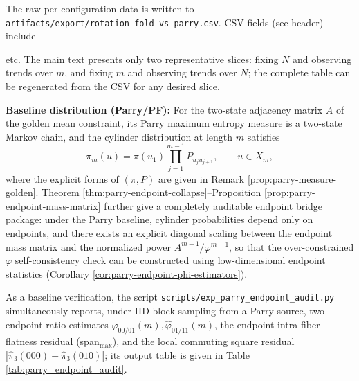 \begin{remark}\label{rem:exp-data-files}
\begin{sloppypar}
The raw per-configuration data is written to \texttt{artifacts/export/rotation\_fold\_vs\_parry.csv}. CSV fields (see header) include
\begin{center}
\end{center}
etc. The main text presents only two representative slices: fixing $N$ and observing trends over $m$, and fixing $m$ and observing trends over $N$; the complete table can be regenerated from the CSV for any desired slice.
\end{sloppypar}
\end{remark}

\textbf{Baseline distribution (Parry/PF):} For the two-state adjacency matrix $A$ of the golden mean constraint, its Parry maximum entropy measure is a two-state Markov chain, and the cylinder distribution at length $m$ satisfies
\[
\pi_m(u)=\pi(u_1)\prod_{j=1}^{m-1}P_{u_j u_{j+1}},\qquad u\in X_m,
\]
where the explicit forms of $(\pi,P)$ are given in Remark \ref{prop:parry-measure-golden}.
Theorem \ref{thm:parry-endpoint-collapse}--Proposition \ref{prop:parry-endpoint-mass-matrix} further give a completely auditable endpoint bridge package: under the Parry baseline, cylinder probabilities depend only on endpoints, and there exists an explicit diagonal scaling between the endpoint mass matrix and the normalized power \(A^{m-1}/\varphi^{m-1}\), so that the over-constrained \(\varphi\) self-consistency check can be constructed using low-dimensional endpoint statistics (Corollary \ref{cor:parry-endpoint-phi-estimators}).

\begin{remark}\label{rem:parry-endpoint-audit}
As a baseline verification, the script \texttt{scripts/exp\_parry\_endpoint\_audit.py} simultaneously reports, under IID block sampling from a Parry source,
two endpoint ratio estimates \(\widehat\varphi_{00/01}(m),\widehat\varphi_{01/11}(m)\),
the endpoint intra-fiber flatness residual (span\(_{\max}\)), and the local commuting square residual \(|\hat\pi_3(000)-\hat\pi_3(010)|\);
its output table is given in Table \ref{tab:parry_endpoint_audit}.
\end{remark}


